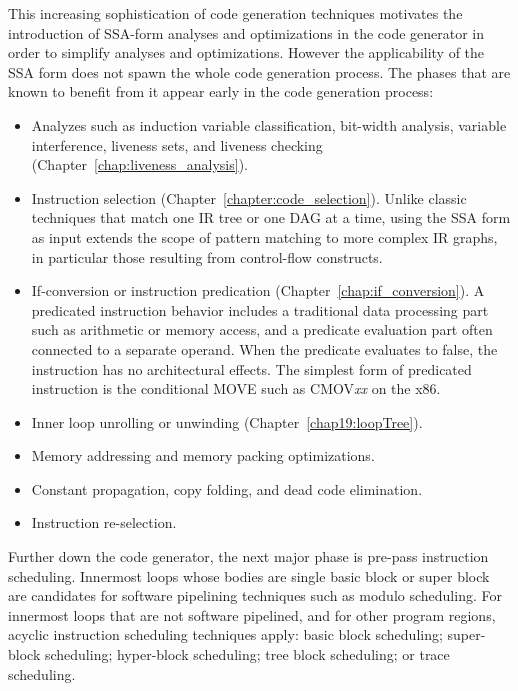 This increasing sophistication of code generation techniques motivates the
introduction of SSA-form analyses and optimizations in the code generator in
order to simplify analyses and optimizations. However the applicability of the SSA
form does not spawn the whole code generation process. The phases that are known
to benefit from it appear early in the code generation process:
\begin{itemize}

\item Analyzes such as induction variable classification, bit-width analysis,
variable interference, liveness sets, and liveness checking
(Chapter~\ref{chap:liveness_analysis}).

\item Instruction selection (Chapter~\ref{chapter:code_selection}). Unlike
classic techniques that match one IR tree or one DAG at a time, using the SSA
form as input extends the scope of pattern matching to more complex IR graphs,
in particular those resulting from control-flow constructs.

\item If-conversion or instruction predication
(Chapter~\ref{chap:if_conversion}). A predicated instruction behavior includes a
traditional data processing part such as arithmetic or memory access, and a
predicate evaluation part often connected to a separate operand. When the
predicate evaluates to false, the instruction has no architectural effects. The
simplest form of predicated instruction is the conditional MOVE such as
CMOV\emph{xx} on the x86. 

\item Inner loop unrolling or unwinding (Chapter~\ref{chap19:loopTree}).

\item Memory addressing and memory packing optimizations.

\item Constant propagation, copy folding, and dead code elimination.

\item Instruction re-selection.

\end{itemize} \medskip

Further down the code generator, the next major phase is pre-pass instruction
scheduling. Innermost loops whose bodies are single basic block or super
block are candidates for software pipelining techniques such as modulo
scheduling. For innermost loops that are not software pipelined, and for other
program regions, acyclic instruction scheduling techniques apply: basic block
scheduling; super-block scheduling; hyper-block scheduling; tree block
scheduling; or trace scheduling.


